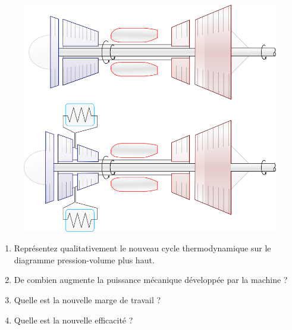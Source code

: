 	\begin{figure}[htc!]%
		\begin{center}
		\includegraphics[width=12cm]{images/circuit_turboshaft_exercice.png}
		\end{center}
		\label{fig_turbomoteurs_exercice}
	\end{figure}
	
	\begin{enumerate}
		\item Représentez qualitativement le nouveau cycle thermodynamique sur le diagramme pression-volume plus haut.
		\item De combien augmente la puissance mécanique développée par la machine ?
		\item Quelle est la nouvelle marge de travail ?
		\item Quelle est la nouvelle efficacité ?
	\end{enumerate}

\exercisesolutionpage
\titreresultats
	
